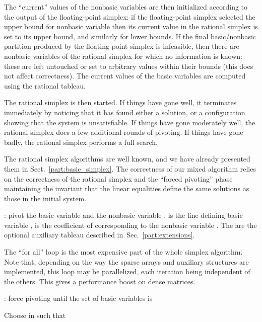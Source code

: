 The ``current'' values of the nonbasic variables are then initialized according to the output of the floating-point simplex: if the floating-point simplex selected the upper bound for nonbasic variable  then its current value in the rational simplex is set to its upper bound, and similarly for lower bounds. If the final basic/nonbasic partition produced by the floating-point simplex is infeasible, then there are nonbasic variables of the rational simplex for which no information is known: these are left untouched or set to arbitrary values within their bounds (this does not affect correctness).  The current values of the basic variables are computed using the rational tableau.

The rational simplex is then started. If things have gone well, it terminates immediately by noticing that it has found either a solution, or a configuration showing that the system is unsatisfiable. If things have gone moderately well, the rational simplex does a few additional rounds of pivoting. If things have gone badly, the rational simplex performs a full search.

The rational simplex algorithms are well known, and we have already presented them in Sect.~\ref{part:basic_simplex}. The correctness of our mixed algorithm relies on the correctness of the rational simplex and 
the ``forced pivoting'' phase maintaining the invariant that the linear equalities define the same solutions as those in the initial system.

\begin{algorithm}
\caption{: pivot the basic variable  and the nonbasic variable .  is the line defining basic variable ,  is the coefficient of  corresponding to the nonbasic variable . The  are the optional auxiliary tableau described in~Sec.~\ref{part:extensions}.}
\label{algo:Pivot}
\begin{algorithmic}
\STATE{; ; ; }
\STATE{}
\FORALL{}
  \STATE{; ; ; }
\ENDFOR
\STATE{}
\end{algorithmic}

The ``for all'' loop is the most expensive part of the whole simplex algorithm.
Note that, depending on the way the sparse arrays and auxiliary structures are implemented, this loop may be parallelized, each iteration being independent of the others. This gives a performance boost on dense matrices.
\end{algorithm}

\begin{algorithm}
\caption{: force pivoting until the set of basic variables is }
\label{algo:ForcedPivot}
\begin{algorithmic}
\STATE 
\REPEAT
  \STATE 
  \FORALL{}
    \IF{}
      \STATE Choose  in  such that 
      \STATE  {}
      \STATE{}
    \ENDIF
  \ENDFOR
\UNTIL{}
\RETURN {}
\end{algorithmic}
\end{algorithm}

